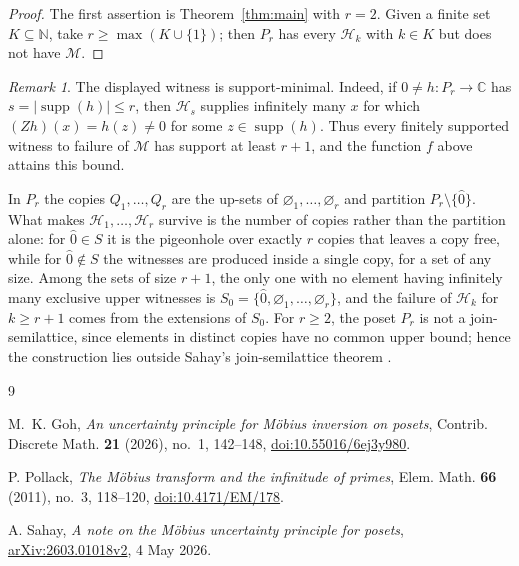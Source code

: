\documentclass[11pt]{amsart}
\theoremstyle{remark}
\newtheorem{remark}[theorem]{Remark}
\newcommand{\supp}{\operatorname{supp}}
\begin{document}
\begin{proof}
The first assertion is Theorem~\ref{thm:main} with $r=2$. Given a finite set
$K\subseteq\mathbb N$, take $r\geq\max(K\cup\{1\})$; then $P_r$ has every
$\mathcal H_k$ with $k\in K$ but does not have $\mathcal M$.
\end{proof}

\begin{remark}
The displayed witness is support-minimal. Indeed, if
$0\neq h\colon P_r\to\mathbb C$ has $s=|\supp(h)|\leq r$, then
$\mathcal H_s$ supplies infinitely many $x$ for which
$(Zh)(x)=h(z)\neq 0$ for some $z\in\supp(h)$. Thus every finitely supported
witness to failure of $\mathcal M$ has support at least $r+1$, and the
function $f$ above attains this bound.

In $P_r$ the
copies $Q_1,\ldots,Q_r$ are the up-sets of
$\varnothing_1,\ldots,\varnothing_r$ and partition
$P_r\setminus\{\widehat 0\}$. What makes $\mathcal H_1,\ldots,\mathcal H_r$
survive is the number of copies rather than the partition alone: for
$\widehat 0\in S$ it is the pigeonhole over exactly $r$ copies that leaves a
copy free, while for $\widehat 0\notin S$ the witnesses are produced inside
a single copy, for a set of any size. Among the sets of size $r+1$, the only
one with no element having infinitely many exclusive upper witnesses is
$S_0=\{\widehat 0,\varnothing_1,\ldots,\varnothing_r\}$, and the failure of
$\mathcal H_k$ for $k\geq r+1$ comes from the extensions of $S_0$.
For $r\geq 2$, the poset $P_r$ is not
a join-semilattice, since elements in distinct copies have no common upper
bound; hence the construction lies outside Sahay's join-semilattice theorem
\cite[Theorem 1.10 and Section 4]{Sahay}.
\end{remark}

\begin{thebibliography}{9}

M.~K. Goh,
\emph{An uncertainty principle for Möbius inversion on posets},
Contrib. Discrete Math. \textbf{21} (2026), no.~1, 142--148,
\href{https://doi.org/10.55016/6ej3y980}{doi:10.55016/6ej3y980}.

P. Pollack,
\emph{The Möbius transform and the infinitude of primes},
Elem. Math. \textbf{66} (2011), no.~3, 118--120,
\href{https://doi.org/10.4171/EM/178}{doi:10.4171/EM/178}.

A. Sahay,
\emph{A note on the Möbius uncertainty principle for posets},
\href{https://arxiv.org/abs/2603.01018}{arXiv:2603.01018v2}, 4 May 2026.

\end{thebibliography}
\end{document}
